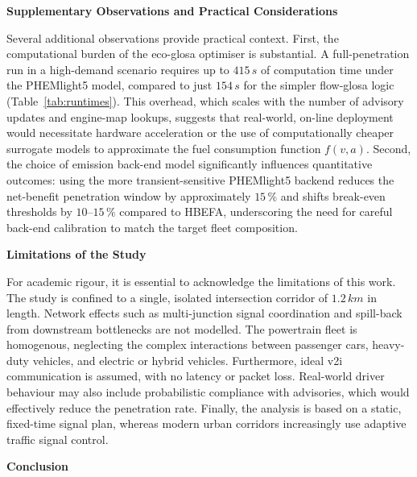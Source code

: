 \bigskip
\textbf{Supplementary Observations and Practical Considerations}

Several additional observations provide practical context. First, the computational burden of the \ac{eco-glosa} optimiser is substantial. A full-penetration run in a high-demand scenario requires up to $415\,\unit{s}$ of computation time under the PHEMlight5 model, compared to just $154\,\unit{s}$ for the simpler \ac{flow-glosa} logic (Table~\ref{tab:runtimes}). This overhead, which scales with the number of advisory updates and engine-map lookups, suggests that real-world, on-line deployment would necessitate hardware acceleration or the use of computationally cheaper surrogate models to approximate the fuel consumption function $f(v,a)$.
\mynewline
Second, the choice of emission back-end model significantly influences quantitative outcomes: using the more transient-sensitive PHEMlight5 backend reduces the net-benefit penetration window by approximately $15\,\%$ and shifts break-even thresholds by $10$–$15\,\%$ compared to HBEFA, underscoring the need for careful back-end calibration to match the target fleet composition.  

\bigskip
\textbf{Limitations of the Study}

For academic rigour, it is essential to acknowledge the limitations of this work. The study is confined to a single, isolated intersection corridor of $1.2\,\unit{km}$ in length. Network effects such as multi-junction signal coordination and spill-back from downstream bottlenecks are not modelled. The powertrain fleet is homogenous, neglecting the complex interactions between passenger cars, heavy-duty vehicles, and electric or hybrid vehicles. Furthermore, ideal \ac{v2i} communication is assumed, with no latency or packet loss. Real-world driver behaviour may also include probabilistic compliance with advisories, which would effectively reduce the penetration rate. Finally, the analysis is based on a static, fixed-time signal plan, whereas modern urban corridors increasingly use adaptive traffic signal control.

\bigskip
\textbf{Conclusion}

